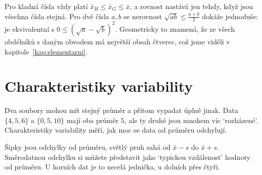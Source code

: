\begin{note}
  Pro kladná čísla vždy platí $\bar{x}_H\leq\bar{x}_G\leq\bar{x}$, a rovnost nastává jen tehdy, když jsou všechna čísla stejná. Pro dvě čísla $a, b$ se nerovnost $\sqrt{ab}\leq\frac{a + b}{2}$ dokáže jednoduše: je ekvivalentní s $0\leq{(\sqrt{a} - \sqrt{b})}^2$. Geometricky to znamená, že ze všech obdélníků s daným obvodem má největší obsah čtverec, což jsme viděli v kapitole~\ref{kap:elementarni}.
\end{note}

\section{Charakteristiky variability}\label{sec:charakteristiky-variability}

Dva soubory mohou mít stejný průměr a přitom vypadat úplně jinak. Data $\{4, 5, 6\}$ a $\{0, 5, 10\}$ mají oba průměr $5$, ale ty druhé jsou mnohem víc `rozházené'. Charakteristiky variability měří, jak moc se data od průměru odchylují.

\begin{center}
\end{center}
Šipky jsou odchylky od průměru, světlý pruh sahá od $\bar{x} - s$ do $\bar{x} + s$. Směrodatnou odchylku si můžete představit jako `typickou vzdálenost' hodnoty od průměru. U horních dat je to necelá jednička, u dolních přes čtyři.


